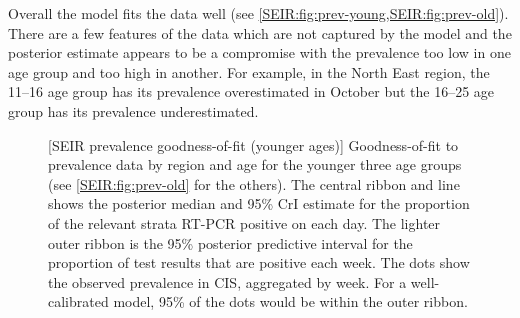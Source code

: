\documentclass[thesis.tex]{subfiles}
\begin{document}
Overall the model fits the data well (see \cref{SEIR:fig:prev-young,SEIR:fig:prev-old}).
There are a few features of the data which are not captured by the model and the posterior estimate appears to be a compromise with the prevalence too low in one age group and too high in another.
For example, in the North East region, the 11--16 age group has its prevalence overestimated in October but the 16--25 age group has its prevalence underestimated.
\begin{figure}
    \vspace{-3cm}
    \captionsetup{width=0.8\paperwidth}
    [SEIR prevalence goodness-of-fit (younger ages)]{%
        Goodness-of-fit to prevalence data by region and age for the younger three age groups (see \cref{SEIR:fig:prev-old} for the others).
        The central ribbon and line shows the posterior median and 95\% CrI estimate for the proportion of the relevant strata RT-PCR positive on each day.
        The lighter outer ribbon is the 95\% posterior predictive interval for the proportion of test results that are positive each week.
        The dots show the observed prevalence in CIS, aggregated by week.
        For a well-calibrated model, 95\% of the dots would be within the outer ribbon.
    }
    \label{SEIR:fig:prev-young}
\end{figure}
\end{document}
